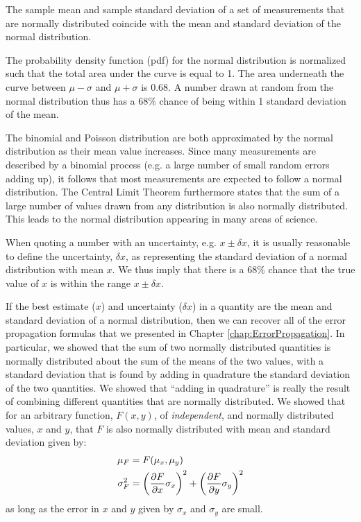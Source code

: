 The sample mean and sample standard deviation of a set of measurements that are normally distributed coincide with the mean and standard deviation of the normal distribution.  

The probability density function (pdf) for the normal distribution is normalized such that the total area under the curve is equal to 1. The area underneath the curve between $\mu-\sigma$ and $\mu+\sigma$ is 0.68. A number drawn at random from the normal distribution thus has a 68\% chance of being within 1 standard deviation of the mean. 

The binomial and Poisson distribution are both approximated by the normal distribution as their mean value increases. Since many measurements are described by a binomial process (e.g. a large number of small random errors adding up), it follows that most measurements are expected to follow a normal distribution. The Central Limit Theorem furthermore states that the sum of a large number of values drawn from any distribution is also normally distributed. This leads to the normal distribution appearing in many areas of science.

When quoting a number with an uncertainty, e.g. $x\pm\delta x$, it is usually reasonable to define the uncertainty, $\delta x$, as representing the standard deviation of a normal distribution with mean $x$. We thus imply that there is a 68\% chance that the true value of $x$ is within the range $x\pm\delta x$.

If the best estimate ($x$) and uncertainty ($\delta x$) in a quantity are the mean and standard deviation of a normal distribution, then we can recover all of the error propagation formulas that we presented in Chapter \ref{chap:ErrorPropagation}. In particular, we showed that the sum of two normally distributed quantities is normally distributed about the sum of the means of the two values, with a standard deviation that is found by adding in quadrature the standard deviation of the two quantities. We showed that ``adding in quadrature'' is really the result of combining different quantities that are normally distributed. We showed that for an arbitrary function, $F(x,y)$, of \textit{independent}, and normally distributed values, $x$ and $y$, that $F$ is also normally distributed with mean and standard deviation given by:
\begin{align}
\mu_F &=F(\mu_x,\mu_y)\nonumber\\
\sigma_F^2&=\left(\frac{\partial F}{\partial x}\sigma_x\right)^2+\left(\frac{\partial F}{\partial y}\sigma_y\right)^2
\end{align}
as long as the error in $x$ and $y$ given by $\sigma_x$ and $\sigma_y$ are small.

